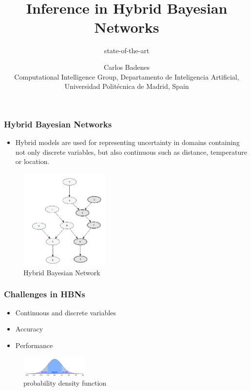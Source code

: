 \documentclass{beamer}
\title[Inference in HBNs]{Inference in Hybrid Bayesian Networks}
\subtitle{state-of-the-art}
\author[Carlos Badenes]{{Carlos Badenes}\\
{\small Computational Intelligence Group, Departamento de Inteligencia Artificial, Universidad Polit\'ecnica de Madrid, Spain}}
\date{}
\begin{document}
\frame{\titlepage}

\begin{frame}
	 \frametitle{Hybrid Bayesian Networks}
	\begin{itemize}
  	  \item Hybrid models are used for representing uncertainty in domains containing not only discrete variables, but also continuous such as distance, temperature or location.
  	\end{itemize}
	\begin{figure}
		  	\centering
    			\includegraphics[width=0.4\textwidth]{polytree.png}
  			\caption{Hybrid Bayesian Network}
		\end{figure}
\end{frame}

\begin{frame}
	   \frametitle{Challenges in HBNs}
	\begin{itemize}
	  \item Continuous and discrete variables
	  \item Accuracy
          \item Performance
  	\end{itemize} 
	\begin{figure}
		  	\centering
    			\includegraphics[width=0.3\textwidth]{pdfunction.png}
  			\caption{probability density function}
		\end{figure}
\end{frame}
\end{document}
